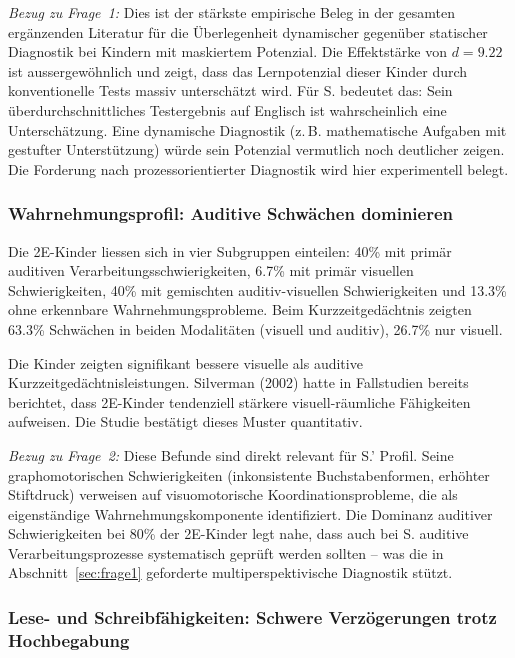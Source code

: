 \documentclass[ngerman, a4paper]{article}
\begin{document}
\textit{Bezug zu Frage~1:} Dies ist der stärkste empirische Beleg in der
gesamten ergänzenden Literatur für die Überlegenheit dynamischer gegenüber
statischer Diagnostik bei Kindern mit maskiertem Potenzial. Die
Effektstärke von $d = 9.22$ ist aussergewöhnlich und zeigt, dass das
Lernpotenzial dieser Kinder durch konventionelle Tests massiv unterschätzt
wird. Für S. bedeutet das: Sein überdurchschnittliches Testergebnis auf
Englisch ist wahrscheinlich eine Unterschätzung. Eine dynamische
Diagnostik (z.\,B. mathematische Aufgaben mit gestufter Unterstützung)
würde sein Potenzial vermutlich noch deutlicher zeigen. Die Forderung nach
prozessorientierter Diagnostik
\parencite{lemas2023begriffsklaerung} wird hier
experimentell belegt.

\subsubsection*{Wahrnehmungsprofil: Auditive Schwächen dominieren}

Die 2E-Kinder liessen sich in vier Subgruppen einteilen: 40\% mit primär
auditiven Verarbeitungsschwierigkeiten, 6.7\% mit primär visuellen
Schwierigkeiten, 40\% mit gemischten auditiv-visuellen Schwierigkeiten und
13.3\% ohne erkennbare Wahrnehmungsprobleme. Beim Kurzzeitgedächtnis
zeigten 63.3\% Schwächen in beiden Modalitäten (visuell und auditiv),
26.7\% nur visuell.

Die Kinder zeigten signifikant bessere visuelle als auditive
Kurzzeitgedächtnisleistungen. Silverman (2002) hatte in Fallstudien
bereits berichtet, dass 2E-Kinder tendenziell stärkere visuell-räumliche
Fähigkeiten aufweisen. Die Studie bestätigt dieses Muster quantitativ.

\textit{Bezug zu Frage~2:} Diese Befunde sind direkt relevant für S.'
Profil. Seine graphomotorischen Schwierigkeiten (inkonsistente
Buchstabenformen, erhöhter Stiftdruck) verweisen auf visuomotorische
Koordinationsprobleme, die \textcite[S.\,5--6]{alhroub2021utility} als eigenständige
Wahrnehmungskomponente identifiziert. Die Dominanz auditiver
Schwierigkeiten bei 80\% der 2E-Kinder legt nahe, dass auch bei S.
auditive Verarbeitungsprozesse systematisch geprüft werden sollten -- was
die in Abschnitt~\ref{sec:frage1} geforderte multiperspektivische
Diagnostik stützt.

\subsubsection*{Lese- und Schreibfähigkeiten: Schwere Verzögerungen trotz
  Hochbegabung}
\end{document}
